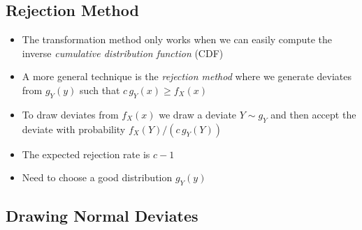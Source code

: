 
\begin{slide}
\section{Rejection Method}

\begin{PauseHighLight}
  \begin{itemize}
  \item The transformation method only works when we can easily compute
    the inverse \textit{cumulative distribution function} (CDF)\pause
  \item A more general technique is the \emph{rejection method} where we
    generate deviates from $g_Y(y)$ such that $c\,g_Y(x)\geq f_X(x)$\pause
  \item To draw deviates from $f_X(x)$ we draw a deviate $Y\sim g_Y$ and
    then accept the deviate with probability $f_X(Y)/(c\,g_Y(Y))$\pause
  \item The expected rejection rate is $c-1$\pause
  \item Need to choose a good distribution $g_Y(y)$\pause
  \end{itemize}
\end{PauseHighLight}

\end{slide}


\begin{slide}
\section{Drawing Normal Deviates}

\pause
\pb
{}
\begin{center}
  \pause
\end{center}

\end{slide}



